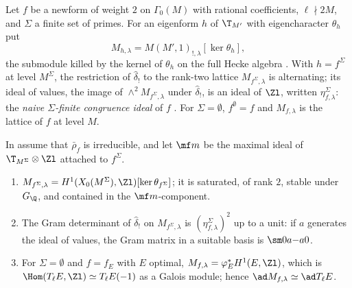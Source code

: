 \begin{definition}\label{def:congruence:eta-sigma}
Let $f$ be a newform of weight $2$ on $\Gamma_0(M)$ with rational coefficients, $\ell\nmid2M$, and $\Sigma$ a finite set of primes. For an eigenform $h$ of $\T_{M'}$ with eigencharacter $\theta_h$ put
\[
M_{h,\lambda}=M(M',1)_{!,\lambda}[\ker\theta_h],
\]
the submodule killed by the kernel of $\theta_h$ on the full Hecke algebra \cite[Sections 1.1.2, 1.6.2]{DFG04}. With $h=f^\Sigma$ at level $M^\Sigma$, the restriction of $\hat\delta_!$ to the rank-two lattice
$M_{f^\Sigma,\lambda}$ is alternating; its ideal of values, the image of $\wedge^2M_{f^\Sigma,\lambda}$ under $\hat\delta_!$, is an ideal of $\Zl$, written $\eta^\Sigma_{f,\lambda}$: the \emph{naive $\Sigma$-finite
congruence ideal} of $f$ \cite[Section 1.7.3]{DFG04}. For $\Sigma=\emptyset$, $f^\emptyset=f$ and $M_{f,\lambda}$ is the lattice of $f$ at level $M$.
\end{definition}

\begin{proposition}\label{prop:congruence:eta-sigma}
In  assume that $\bar\rho_f$ is irreducible, and let $\mf m$ be the maximal ideal of $\T_{M^\Sigma}\otimes\Zl$ attached to $f^\Sigma$.
\begin{enumerate}[label=(\roman*)]
\item $M_{f^\Sigma,\lambda}=H^1(X_0(M^\Sigma),\Zl)[\ker\theta_{f^\Sigma}]$; it is saturated, of rank $2$, stable under $G_\Q$, and contained in the $\mf m$-component.
\item The Gram determinant of $\hat\delta_!$ on $M_{f^\Sigma,\lambda}$ is $(\eta^\Sigma_{f,\lambda})^2$ up to a unit: if $a$ generates the ideal of values, the Gram matrix in a suitable basis is $\sm0a{-a}0$.
\item For $\Sigma=\emptyset$ and $f=f_E$ with $E$ optimal, $M_{f,\lambda}=\varphi_E^*H^1(E,\Zl)$, which is $\Hom(T_\ell E,\Zl)\simeq T_\ell E(-1)$ as a Galois module; hence $\ad M_{f,\lambda}\simeq\ad T_\ell E$.
\end{enumerate}
\end{proposition}

